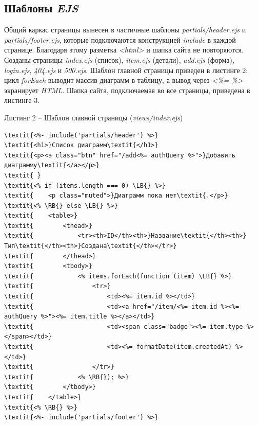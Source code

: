 \documentclass[14pt,a4paper]{extarticle}
\newcommand{\LB}{\char123}
\newcommand{\RB}{\char125}
\begin{document}
\subsection{Шаблоны \textit{EJS}}

Общий каркас страницы вынесен в частичные шаблоны \textit{partials/header.ejs} и \textit{partials/footer.ejs}, которые подключаются конструкцией \textit{include} в каждой странице. Благодаря этому разметка \textit{<html>} и шапка сайта не повторяются. Созданы страницы \textit{index.ejs} (список), \textit{item.ejs} (детали), \textit{add.ejs} (форма), \textit{login.ejs}, \textit{404.ejs} и \textit{500.ejs}. Шаблон главной страницы приведен в листинге 2: цикл \textit{forEach} выводит массив диаграмм в таблицу, а вывод через \textit{<\%= \%>} экранирует \textit{HTML}. Шапка сайта, подключаемая во все страницы, приведена в листинге 3.

\noindent\vspace{18pt}\par\nopagebreak\noindent Листинг 2 – Шаблон главной страницы (\textit{views/index.ejs})\par\nopagebreak
\begin{Verbatim}[commandchars=\\\{\},fontsize=\small,baselinestretch=1]
\textit{<%- include('partials/header') %>}
\textit{<h1>}Список диаграмм\textit{</h1>}
\textit{<p><a class="btn" href="/add<%= authQuery %>">}Добавить диаграмму\textit{</a></p>}
\textit{ }
\textit{<% if (items.length === 0) \LB{} %>}
\textit{    <p class="muted">}Диаграмм пока нет\textit{.</p>}
\textit{<% \RB{} else \LB{} %>}
\textit{    <table>}
\textit{        <thead>}
\textit{            <tr><th>ID</th><th>}Название\textit{</th><th>}Тип\textit{</th><th>}Создана\textit{</th></tr>}
\textit{        </thead>}
\textit{        <tbody>}
\textit{            <% items.forEach(function (item) \LB{} %>}
\textit{                <tr>}
\textit{                    <td><%= item.id %></td>}
\textit{                    <td><a href="/item/<%= item.id %><%= authQuery %>"><%= item.title %></a></td>}
\textit{                    <td><span class="badge"><%= item.type %></span></td>}
\textit{                    <td><%= formatDate(item.createdAt) %></td>}
\textit{                </tr>}
\textit{            <% \RB{}); %>}
\textit{        </tbody>}
\textit{    </table>}
\textit{<% \RB{} %>}
\textit{<%- include('partials/footer') %>}
\end{Verbatim}
\vspace{18pt}
\end{document}
